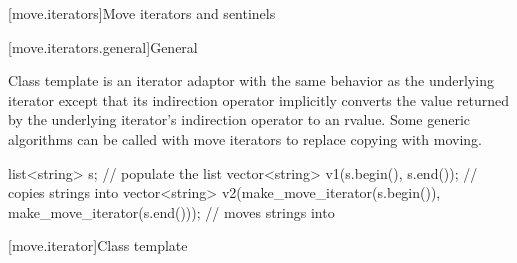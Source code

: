 [move.iterators]{Move iterators and sentinels}

[move.iterators.general]{General}

\pnum
Class template  is an iterator adaptor
with the same behavior as the underlying iterator except that its
indirection operator implicitly converts the value returned by the
underlying iterator's indirection operator to an rvalue.
Some generic algorithms can be called with move iterators to replace
copying with moving.

\pnum
\begin{example}
\begin{codeblock}
list<string> s;
// populate the list 
vector<string> v1(s.begin(), s.end());          // copies strings into 
vector<string> v2(make_move_iterator(s.begin()),
                  make_move_iterator(s.end())); // moves strings into 
\end{codeblock}
\end{example}

[move.iterator]{Class template }

